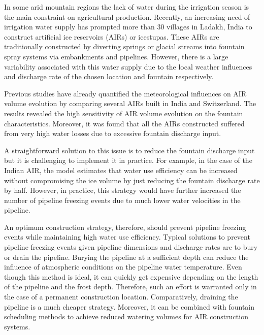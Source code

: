 \documentclass[tc, manuscript]{copernicus}
\begin{document}
\introduction

In some arid mountain regions the lack of water during the irrigation season is the main constraint on
agricultural production. Recently, an increasing need of irrigation water supply has prompted more than 30
villages in Ladakh, India to construct artificial ice reservoirs (AIRs) or icestupas. These AIRs are
traditionally constructed by diverting springs or glacial streams into fountain spray systems via
embankments and pipelines. However, there is a large variability associated with this water supply due to the
local weather influences and discharge rate of the chosen location and fountain respectively. 

Previous studies \citep{balasubramanianInfluenceMeteorologicalConditions2022,
oerlemansBriefCommunicationGrowth2021} have already quantified the meteorological influences on AIR volume
evolution by comparing several AIRs built in India and Switzerland. The results revealed the high sensitivity of
AIR volume evolution on the fountain characteristics. Moreover, it was found that all the AIRs constructed
suffered from very high water losses due to excessive fountain discharge input. 

A straightforward solution to this issue is to reduce the fountain discharge input but it is challenging to
implement it in practice. For example, in the case of the Indian AIR, the model estimates that water use
efficiency can be increased without compromising the ice volume by just reducing the fountain discharge rate by
half. However, in practice, this strategy would have further increased the number of pipeline freezing events
due to much lower water velocities in the pipeline. 

An optimum construction strategy, therefore, should prevent pipeline freezing events while maintaining high
water use efficiency. Typical solutions to prevent pipeline freezing events given pipeline dimensions and
discharge rates are to bury or drain the pipeline. Burying the pipeline at a sufficient depth can reduce the
influence of atmospheric conditions on the pipeline water temperature. Even though this method is ideal, it can
quickly get expensive depending on the length of the pipeline and the frost depth. Therefore, such an effort is
warranted only in the case of a permanent construction location. Comparatively, draining the pipeline is a much
cheaper strategy. Moreover, it can be combined with fountain scheduling methods to achieve reduced watering
volumes for AIR construction systems.
\end{document}
